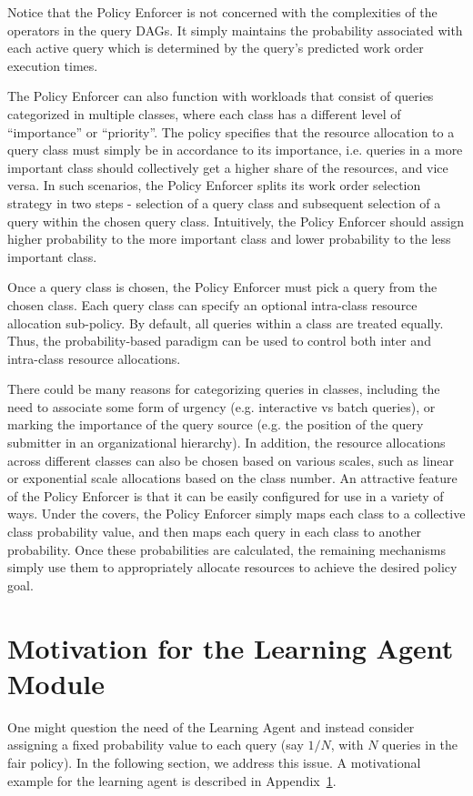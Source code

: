 Notice that the Policy Enforcer is not concerned with the complexities of the operators in the query DAGs. 
It simply maintains the probability associated with each active query which is determined by the query's predicted work order execution times.

The Policy Enforcer can also function with workloads that consist of queries categorized in multiple classes, where each class has a different level of ``importance'' or ``priority''. 
The policy specifies that the resource allocation to a query class must simply be in accordance to its importance, i.e. queries in a more important class should collectively get a higher share of the resources, and vice versa.
In such scenarios, the Policy Enforcer splits its work order selection strategy in two steps - selection of a query class and subsequent selection of a 
query within the chosen query class.
Intuitively, the Policy Enforcer should assign higher probability to the more 
important class and lower probability to the less important class.

Once a query class is chosen, the Policy Enforcer must pick a query from the chosen class. 
Each query class can specify an optional intra-class resource allocation sub-policy. 
By default, all queries within a class are treated equally.
Thus, the probability-based paradigm can be used to control both inter and intra-class resource allocations.

There could be many reasons for categorizing queries in classes, including the need to associate some form of urgency (e.g. interactive vs batch queries), or marking the importance of the query source 
(e.g. the position of the query submitter in an organizational hierarchy). 
In addition, the resource allocations across different classes can also be chosen based on various scales, such as linear or exponential scale allocations based on the class number. 
An attractive feature of the Policy Enforcer is that it can be easily configured for use in a variety of ways.
Under the covers, the Policy Enforcer simply maps each class to a collective class probability value, and then maps each query in each class to another probability. 
Once these probabilities are calculated, the remaining mechanisms simply use them to appropriately allocate resources to achieve the desired policy goal.

\section{Motivation for the Learning Agent Module}\label{apx:learning-motivation}
One might question the need of the Learning Agent and instead consider assigning a fixed probability value to each query (say $1/N$, with $N$ queries in the fair policy).
In the following section, we address this issue. 
A motivational example for the learning agent is described in Appendix~\ref{apx:learning-motivation}.

